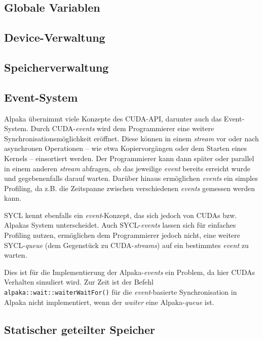 \subsection{Globale Variablen}\label{implementierung:probleme:globalvar}

\subsection{Device-Verwaltung}\label{implementierung:probleme:device}

\subsection{Speicherverwaltung}\label{implementierung:probleme:speicher}

\subsection{Event-System}\label{implementierung:probleme:events}

Alpaka übernimmt viele Konzepte des CUDA-API, darunter auch das Event-System.
Durch CUDA-\textit{events} wird dem Programmierer eine weitere
Synchronisationsmöglichkeit eröffnet. Diese können in einem \textit{stream} vor
oder nach asynchronen Operationen -- wie etwa Kopiervorgängen oder dem Starten
eines Kernels -- einsortiert werden. Der Programmierer kann dann später oder
parallel in einem anderen \textit{stream} abfragen, ob das jeweilige
\textit{event} bereits erreicht wurde und gegebenenfalls darauf warten. Darüber
hinaus ermöglichen \textit{events} ein simples Profiling, da z.B. die Zeitspanne
zwischen verschiedenen \textit{events} gemessen werden kann.

SYCL kennt ebenfalls ein \textit{event}-Konzept, das sich jedoch von CUDAs bzw.
Alpakas System unterscheidet. Auch SYCL-\textit{events} lassen sich für
einfaches Profiling nutzen, ermöglichen dem Programmierer jedoch nicht, eine
weitere SYCL-\textit{queue} (dem Gegenstück zu CUDA-\textit{streams}) auf ein
bestimmtes \textit{event} zu warten.

Dies ist für die Implementierung der Alpaka-\textit{events} ein Problem, da hier
CUDAs Verhalten simuliert wird. Zur Zeit ist der Befehl
\texttt{alpaka::wait::waiterWaitFor()} für die \textit{event}-basierte
Synchronisation in Alpaka nicht implementiert, wenn der \textit{waiter} eine
Alpaka-\textit{queue} ist.

\subsection{Statischer geteilter Speicher}
\label{implementierung:probleme:shared}

